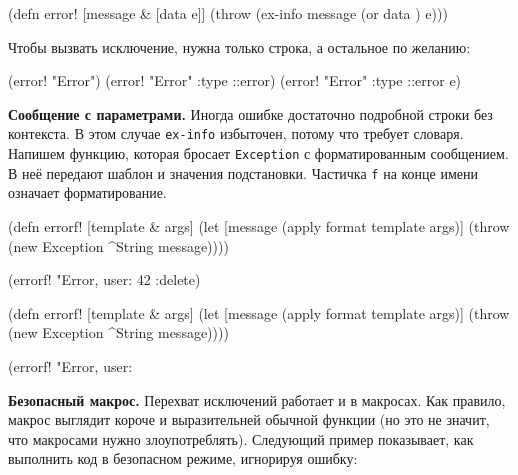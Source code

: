 \else

\begin{english}
  \begin{clojure}
(defn error! [message & [data e]]
  (throw (ex-info message (or data {}) e)))
  \end{clojure}
\end{english}

\fi

\noindent
Чтобы вызвать исключение, нужна только строка, а остальное по желанию:

\begin{english}
  \begin{clojure}
(error! "Error")
(error! "Error" {:type ::error})
(error! "Error" {:type ::error} e)
  \end{clojure}
\end{english}

\textbf{Сообщение с параметрами.} Иногда ошибке достаточно подробной строки без
контекста. В этом случае \verb|ex-info| избыточен, потому что требует
словаря. Напишем функцию, которая бросает \verb|Exception| с форматированным
сообщением. В неё передают шаблон и значения подстановки. Частичка \verb|f| на
конце имени означает форматирование.


\ifnarrow

\begin{english}
  \begin{clojure}
(defn errorf! [template & args]
  (let [message (apply format
                  template args)]
    (throw (new Exception
             ^String message))))

(errorf! "Error, user: %
  42 :delete)
  \end{clojure}
\end{english}

\else

\begin{english}
  \begin{clojure}
(defn errorf! [template & args]
  (let [message (apply format template args)]
    (throw (new Exception ^String message))))

(errorf! "Error, user: %
  \end{clojure}
\end{english}

\fi

\textbf{Безопасный макрос.} Перехват исключений работает и в макросах. Как
правило, макрос выглядит короче и выразительней обычной функции (но это не
значит, что макросами нужно злоупотреблять). Следующий пример показывает, как
выполнить код в безопасном режиме, игнорируя ошибку:

